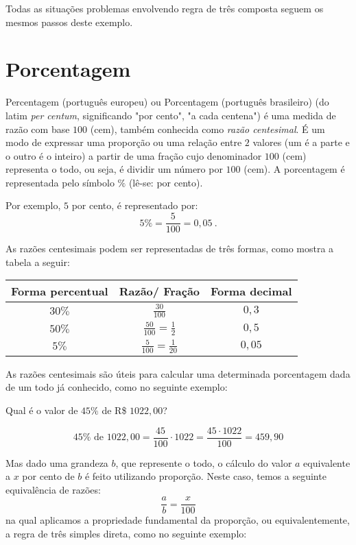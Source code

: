 Todas as situações problemas envolvendo regra de três composta seguem os mesmos passos deste exemplo.


\chapter{Porcentagem}

Percentagem (português europeu) ou Porcentagem (português brasileiro) (do latim \textit{per centum}, significando "por cento", "a cada centena") é uma medida de razão com base $100$ (cem), também conhecida como \textit{razão centesimal}. É um modo de expressar uma proporção ou uma relação entre $2$ valores (um é a parte e o outro é o inteiro) a partir de uma fração cujo denominador $100$ (cem) representa o todo, ou seja, é dividir um número por $100$ (cem). A porcentagem é representada pelo símbolo $\%$ (lê-se: por cento).

Por exemplo, $5$ por cento, é representado por:
\[ 5\%= \frac{5}{100}= 0,05 \ .\]

As razões centesimais podem ser representadas de três formas, como mostra a tabela a seguir:

\begin{table}[h]
\centering
 \begin{tabular}{|c|c|c|} \hline
  {\textbf{Forma percentual}} & {\textbf{Razão/ Fração}} & \textbf{Forma decimal} \\ \hline
 $30\%$ & $\frac{30}{100}$ & $0,3$ \\\hline
 $50\%$ & $\frac{50}{100} = \frac{1}{2}$ & $0,5$ \\\hline
 $5\%$ & $\frac{5}{100}=\frac{1}{20}$ & $0,05$ \\\hline
 \end{tabular}
\end{table}

As razões centesimais são úteis para calcular uma determinada porcentagem dada de um todo já conhecido, como no seguinte exemplo:
\begin{exem}
 Qual é o valor de $45 \%$ de R\$ $1022,00$?

\[45 \% \text{ de } 1022,00= \frac{45}{100} \cdot 1022= \frac{45\cdot 1022}{100}= 459,90\]
\fim
\end{exem}


Mas dado uma grandeza $b$, que represente o todo, o cálculo do valor $a$ equivalente a $x$ por cento de $b$ é feito utilizando proporção. Neste caso, temos a seguinte equivalência de razões:
\[\frac{a}{b}= \frac{x}{100}\]
na qual aplicamos a propriedade fundamental da proporção, ou equivalentemente, a regra de três simples direta, como no seguinte exemplo:


